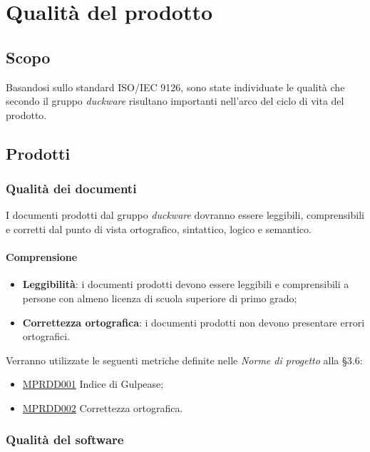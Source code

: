 \clearpage
\section{Qualità del prodotto}
\label{sec:qualita_prodotto}
\subsection{Scopo}
\label{sec:qualita_prodotto_scopo}
Basandosi sullo standard ISO/IEC 9126, sono state individuate le qualità che secondo il gruppo \emph{duckware} risultano importanti nell'arco del ciclo di vita del prodotto.
\subsection{Prodotti}
\subsubsection{Qualità dei documenti}
\label{sec:qualita_documenti}
I documenti prodotti dal gruppo \emph{duckware} dovranno essere leggibili, comprensibili e corretti dal punto di vista ortografico, sintattico, logico e semantico.
\paragraph{Comprensione}
\begin{itemize}
	\item \textbf{Leggibilità}: i documenti prodotti devono essere leggibili e comprensibili a persone con almeno licenza di scuola superiore di primo grado;
	\item \textbf{Correttezza ortografica}: i documenti prodotti non devono presentare errori ortografici.
\end{itemize}
Verranno utilizzate le seguenti metriche definite nelle \textit{Norme di progetto} alla §3.6:
\begin{itemize}
	\item \hyperref[sec:qprodotto_tabella_metriche_obiettivi]{MPRDD001} Indice di Gulpease;
	\item \hyperref[sec:qprodotto_tabella_metriche_obiettivi]{MPRDD002} Correttezza ortografica.
\end{itemize}
\subsubsection{Qualità del software}
\label{sec:qualita_software}
